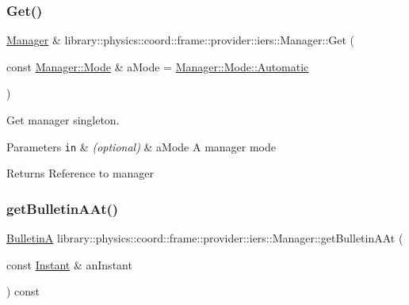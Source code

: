 \subsubsection{\texorpdfstring{Get()}{Get()}}
{\footnotesize\ttfamily \hyperlink{classlibrary_1_1physics_1_1coord_1_1frame_1_1provider_1_1iers_1_1_manager}{Manager} \& library\+::physics\+::coord\+::frame\+::provider\+::iers\+::\+Manager\+::\+Get (\begin{DoxyParamCaption}\item[{const \hyperlink{classlibrary_1_1physics_1_1coord_1_1frame_1_1provider_1_1iers_1_1_manager_a84f44554ac04c5e18ed7ff448debf392}{Manager\+::\+Mode} \&}]{a\+Mode = {\ttfamily \hyperlink{classlibrary_1_1physics_1_1coord_1_1frame_1_1provider_1_1iers_1_1_manager_a84f44554ac04c5e18ed7ff448debf392a086247a9b57fde6eefee2a0c4752242d}{Manager\+::\+Mode\+::\+Automatic}} }\end{DoxyParamCaption})\hspace{0.3cm}{\ttfamily [static]}}



Get manager singleton. 


\begin{DoxyParams}[1]{Parameters}
\mbox{\tt in}  & {\em (optional)} & a\+Mode A manager mode \\
\hline
\end{DoxyParams}
\begin{DoxyReturn}{Returns}
Reference to manager 
\end{DoxyReturn}
\mbox{\label{classlibrary_1_1physics_1_1coord_1_1frame_1_1provider_1_1iers_1_1_manager_ab6d7d7f3bdbf9d982a8507aa2455d6ca}} 
\subsubsection{\texorpdfstring{get\+Bulletin\+A\+At()}{getBulletinAAt()}}
{\footnotesize\ttfamily \hyperlink{classlibrary_1_1physics_1_1coord_1_1frame_1_1provider_1_1iers_1_1_bulletin_a}{BulletinA} library\+::physics\+::coord\+::frame\+::provider\+::iers\+::\+Manager\+::get\+Bulletin\+A\+At (\begin{DoxyParamCaption}\item[{const \hyperlink{classlibrary_1_1physics_1_1time_1_1_instant}{Instant} \&}]{an\+Instant }\end{DoxyParamCaption}) const}




